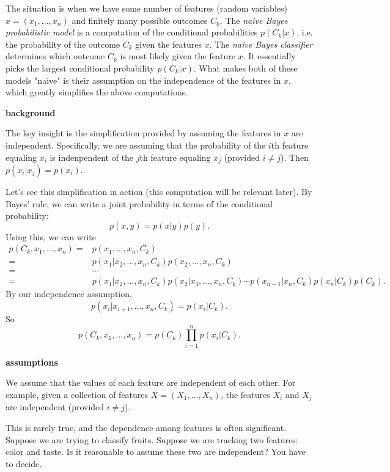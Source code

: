 \documentclass[12pt]{article}
\begin{document}
The situation is when we have some number of features (random variables) $x=(x_1,\dots,x_n)$ and finitely many possible outcomes $C_k$. The \emph{naive Bayes probabilistic model} is a computation of the conditional probabilities $p(C_k | x)$, i.e. the probability of the outcome $C_k$ given the features $x$. The \emph{naive Bayes classifier} determines which outcome $C_k$ is most likely given the feature $x$. It essentially picks the largest conditional probability $p(C_k | x)$. What makes both of these models "naive" is their assumption on the independence of the features in $x$, which greatly simplifies the above computations.

\textbf{background}

The key insight is the simplification provided by assuming the features in $x$ are independent. Specifically, we are assuming that the probability of the $i$th feature equaling $x_i$ is indenpendent of the $j$th feature equaling $x_j$ (provided $i\neq j$). Then $p(x_i|x_j)=p(x_i)$. 

Let's see this simplification in action (this computation will be relevant later). By Bayes' rule, we can write a joint probability in terms of the conditional probability:
\begin{equation*}
	p(x,y)=p(x|y)p(y).
\end{equation*}
Using this, we can write 
\begin{align*}
	p(C_k,x_1,\dots,x_n) 
	=& p(x_1,\dots,x_n,C_k) \\
	=& p(x_1 | x_2,\dots,x_n,C_k) p(x_2,\dots,x_n,C_k) \\
	=& \cdots \\
	=& p(x_1 | x_2,\dots,x_n,C_k)p(x_2|x_3,\dots,x_n,C_k)\cdots p(x_{n-1}|x_n,C_k)p(x_n|C_k)p(C_k).
\end{align*}
By our independence assumption, 
\begin{equation*}
	p(x_i | x_{i+1},\dots,x_n,C_k) = p(x_i|C_k).
\end{equation*}
So 
\begin{equation*}
	p(C_k,x_1,\dots,x_n) = p(C_k)\prod_{i=1}^n p(x_i|C_k).
\end{equation*}

\textbf{assumptions}

We assume that the values of each feature are independent of each other. For example, given a collection of features $X=(X_1,\dots,X_n)$, the features $X_i$ and $X_j$ are independent (provided $i\neq j$). 

This is rarely true, and the dependence among features is often significant. Suppose we are trying to classify fruits. Suppose we are tracking two features: color and taste. Is it reasonable to assume these two are independent? You have to decide.
\end{document}
